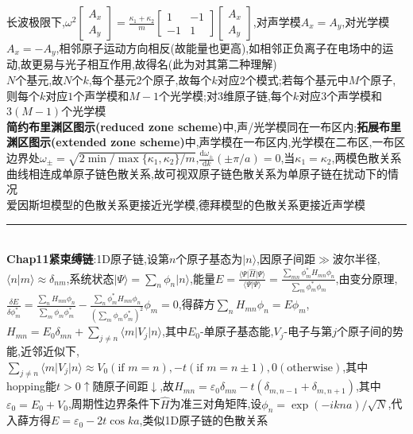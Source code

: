 \documentclass[UTF8,10pt,a4paper]{article}
\begin{document}
\begin{multicols}{2}
长波极限下,$\omega^2\left[\begin{smallmatrix}
    A_x\\
    A_y
\end{smallmatrix}\right]=\frac{\kappa_1+\kappa_2}{m}\left[\begin{smallmatrix}
    1&-1\\
    -1&1
\end{smallmatrix}\right]\left[\begin{smallmatrix}
    A_x\\
    A_y
\end{smallmatrix}\right]$,对声学模$A_x=A_y$,对光学模$A_x=-A_y$,相邻原子运动方向相反(故能量也更高),如相邻正负离子在电场中的运动,故更易与光子相互作用,故得名(此为对其第二种理解)\\
$N$个基元,故$N$个$k$,每个基元$2$个原子,故每个$k$对应$2$个模式;若每个基元中$M$个原子,则每个$k$对应$1$个声学模和$M-1$个光学模;对$3$维原子链,每个$k$对应$3$个声学模和$3(M-1)$个光学模\\
\textbf{简约布里渊区图示(reduced zone scheme)}中,声/光学模同在一布区内;\textbf{拓展布里渊区图示(extended zone scheme)}中,声学模在一布区内,光学模在二布区,一布区边界处$\omega_{\pm}=\sqrt{2\min/\max\{\kappa_1,\kappa_2\}/m}$,$\frac{\mathrm{d}\omega_{\pm}}{\mathrm{d}k}(\pm\pi/a)=0$,当$\kappa_1=\kappa_2$,两模色散关系曲线相连成单原子链色散关系,故可视双原子链色散关系为单原子链在扰动下的情况\\
爱因斯坦模型的色散关系更接近光学模,德拜模型的色散关系更接近声学模\\
\rule{\columnwidth}{.2pt}\\
\textbf{Chap11紧束缚链}:1D原子链,设第$n$个原子基态为$\lvert n\rangle$,因原子间距$\gg$波尔半径,$\langle n\vert m\rangle\approx\delta_{nm}$,系统状态$\lvert \Psi\rangle=\sum_n\phi_n\lvert n\rangle$,能量$E=\frac{\langle\Psi\rvert\hat{H}\lvert\Psi\rangle}{\langle\Psi\vert\Psi\rangle}=\frac{\sum_{mn}\phi_m^*H_{mn}\phi_n}{\sum_m\phi_m^*\phi_m}$,由变分原理,$\frac{\delta E}{\delta\phi_m^*}=\frac{\sum_nH_{mn}\phi_n}{\sum_m\phi_m\phi_m^*}-\frac{\sum_n\phi_m^*H_{mn}\phi_n}{(\sum_m\phi_m\phi_m^*)^2}\phi_m=0$,得薛方$\sum\limits_nH_{mn}\phi_n=E\phi_m$,$H_{mn}=E_0\delta_{mn}+\sum_{j\neq n}\langle m\rvert V_j\lvert n\rangle$,其中$E_0$-单原子基态能,$V_j$-电子与第$j$个原子间的势能,近邻近似下,$\sum_{j\neq n}\langle m\rvert V_j\lvert n\rangle\approx V_0(\text{if }m=n),-t(\text{if }m=n\pm 1),0(\text{otherwise})$,其中hopping能$t>0\uparrow$随原子间距$\downarrow$,故$H_{mn}=\varepsilon_0\delta_{mn}-t(\delta_{m,n-1}+\delta_{m,n+1})$,其中$\varepsilon_0=E_0+V_0$,周期性边界条件下$\hat{H}$为准三对角矩阵,设$\phi_n=\exp(-ikna)/\sqrt{N}$,代入薛方得$E=\varepsilon_0-2t\cos ka$,类似1D原子链的色散关系\\

\end{multicols}
\end{document}
